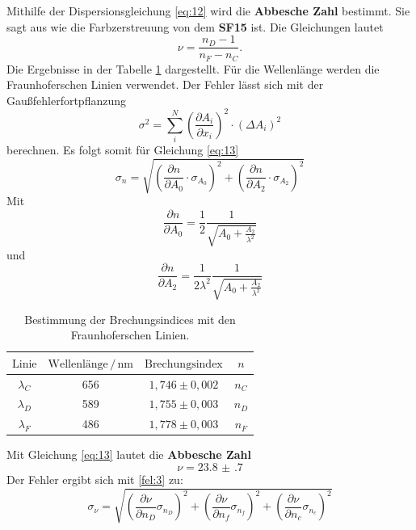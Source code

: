 Mithilfe der Dispersionsgleichung \ref{eq:12} wird die \textbf{Abbesche Zahl} bestimmt.
Sie sagt aus wie die Farbzerstreuung von dem \textbf{SF15} ist.
Die Gleichungen lautet
\begin{equation}
  \nu = \frac{n_D -1}{n_F-n_C}.
  \label{eq:13}
\end{equation}
Die Ergebnisse in der Tabelle \ref{tab:3}
dargestellt. Für die Wellenlänge werden die Fraunhoferschen Linien verwendet.
Der Fehler lässt sich mit der Gaußfehlerfortpflanzung
\begin{equation}
  \sigma^2 = \sum_i^N (\frac{\partial A_i}{\partial x_i})^2 \cdot (\Delta A_i)^2
  \label{fel:3}
\end{equation}
berechnen.
Es folgt somit für Gleichung \ref{eq:13}
\begin{equation*}
  \sigma_{n} = \sqrt{(\frac{\partial n}{\partial A_0} \cdot \sigma_{A_0})^2 + (\frac{\partial n}{\partial A_2} \cdot \sigma_{A_2})^2}
\end{equation*}
Mit
\begin{equation*}
  \frac{\partial n}{\partial A_0} = \frac{1}{2} \frac{1}{\sqrt{A_0 + \frac{A_2}{\lambda^2}}}
\end{equation*}
und
\begin{equation*}
  \frac{\partial n}{\partial A_2} = \frac{1}{2 \lambda^2} \frac{1}{\sqrt{A_0 + \frac{A_2}{\lambda^2}}}
\end{equation*}
\begin{table}[H]
  \centering
  \caption{Bestimmung der Brechungsindices mit den Fraunhoferschen Linien.}
  \label{tab:3}
  \begin{tabular}{c c c c }
    \toprule
    $\text{Linie}$ & $\text{Wellenlänge} \,/\,\si{\nano\meter}$ & $\text{Brechungsindex}$ &$n$\\
    \midrule
    $\lambda_C$ & 656 & $1,746 \pm 0,002$ & $n_C$\\
    $\lambda_D$ & 589 & $1,755 \pm 0,003$ & $n_D$\\
    $\lambda_F$ & 486 & $1,778 \pm 0,003$ & $n_F$\\
    \bottomrule
  \end{tabular}
\end{table}
Mit Gleichung \ref{eq:13} lautet die \textbf{Abbesche Zahl}
\begin{equation*}
  \nu = \num{23.8(7)}
\end{equation*}
Der Fehler ergibt sich mit \ref{fel:3} zu:
\begin{equation*}
  \sigma_\nu = \sqrt{(\frac{\partial \nu}{\partial n_D} \sigma_{n_D})^2 + (\frac{\partial \nu}{\partial n_f} \sigma_{n_f})^2 + (\frac{\partial \nu}{\partial n_c} \sigma_{n_c})^2}
\end{equation*}
